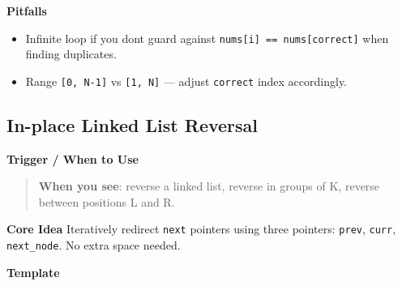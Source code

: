 \documentclass[11pt]{article}
\providecommand{\tightlist}{\setlength{\itemsep}{1pt}\setlength{\parskip}{0pt}}
\begin{document}
\textbf{Pitfalls}

\begin{itemize}
\tightlist
\item
  Infinite loop if you don\textquotesingle t guard against \texttt{nums{[}i{]}\ ==\ nums{[}correct{]}} when finding duplicates.
\item
  Range \texttt{{[}0,\ N-1{]}} vs \texttt{{[}1,\ N{]}} --- adjust \texttt{correct} index accordingly.
\end{itemize}

\subsection{In-place Linked List Reversal}\label{in-place-linked-list-reversal}

\textbf{Trigger / When to Use}

\begin{quote}
\textbf{When you see}: reverse a linked list, reverse in groups of K, reverse between positions L and R.
\end{quote}

\textbf{Core Idea}
Iteratively redirect \texttt{next} pointers using three pointers: \texttt{prev}, \texttt{curr}, \texttt{next\_node}. No extra space needed.

\textbf{Template}

\end{document}
